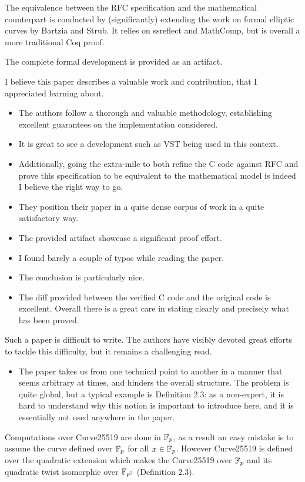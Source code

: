 The equivalence between the RFC specification and the mathematical counterpart
is conducted by (significantly) extending the work on formal elliptic curves by
Bartzia and Strub. It relies on ssreflect and MathComp, but is overall a more
traditional Coq proof.

The complete formal development is provided as an artifact.

\begin{center}
\end{center}
I believe this paper describes a valuable work and contribution, that I appreciated learning about.
\begin{itemize}
    \item The authors follow a thorough and valuable methodology, establishing excellent guarantees on the implementation considered.
    \item It is great to see a development such as VST being used in this context.
    \item Additionally, going the extra-mile to both refine the C code against RFC and prove this specification to be equivalent to the mathematical model is indeed I believe the right way to go.
    \item They position their paper in a quite dense corpus of work in a quite satisfactory way.
    \item The provided artifact showcase a significant proof effort.
    \item I found barely a couple of typos while reading the paper.
    \item The conclusion is particularly nice.
    \item The diff provided between the verified C code and the original code is excellent. Overall there is a great care in stating clearly and precisely what has been proved.
\end{itemize}

\begin{center}
\end{center}

Such a paper is difficult to write. The authors have visibly devoted great efforts to tackle this difficulty, but it remains a challenging read.
\begin{itemize}
    \item The paper takes us from one technical point to another in a manner that seems arbitrary at times, and hinders the overall structure. The problem is quite global, but a typical example is Definition 2.3: as a non-expert, it is hard to understand why this notion is important to introduce here, and it is essentially not used anywhere in the paper.
\end{itemize}
\begin{answer}
    Computations over Curve25519 are done in $\mathbb{F}_{p}$, as a result an easy mistake is to assume the curve defined over $\mathbb{F}_{p}$ for all $x \in \mathbb{F}_{p}$. However Curve25519 is defined over the quadratic extension which makes the Curve25519 over $\mathbb{F}_{p}$ and its quadratic twist isomorphic over $\mathbb{F}_{p^2}$ (Definition 2.3).
\end{answer}

